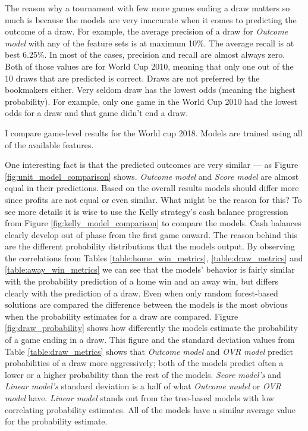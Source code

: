 The reason why a tournament with few more games ending a draw matters so much is because the models are very inaccurate when it comes to predicting the outcome of a draw. For example, the average precision of a draw for \textit{Outcome model} with any of the feature sets is at maximum 10\%. The average recall is at best 6.25\%. In most of the cases, precision and recall are almost always zero. Both of those values are for World Cup 2010, meaning that only one out of the 10 draws that are predicted is correct. Draws are not preferred by the bookmakers either. Very seldom draw has the lowest odds (meaning the highest probability). For example, only one game in the World Cup 2010 had the lowest odds for a draw and that game didn't end a draw.

I compare game-level results for the World cup 2018. Models are trained using all of the available features.

One interesting fact is that the predicted outcomes are very similar --- as Figure \ref{fig:unit_model_comparison} shows. \textit{Outcome model} and \textit{Score model} are almost equal in their predictions. Based on the overall results models should differ more since profits are not equal or even similar. What might be the reason for this? To see more details it is wise to use the Kelly strategy's cash balance progression from Figure \ref{fig:kelly_model_comparison} to compare the models. Cash balances clearly develop out of phase from the first game onward. The reason behind this are the different probability distributions that the models output. By observing the correlations from Tables \ref{table:home_win_metrics}, \ref{table:draw_metrics} and \ref{table:away_win_metrics} we can see that the models' behavior is fairly similar with the probability prediction of a home win and an away win, but differs clearly with the prediction of a draw. Even when only random forest-based solutions are compared the difference between the models is the most obvious when the probability estimates for a draw are compared. Figure \ref{fig:draw_probability} shows how differently the models estimate the probability of a game ending in a draw. This figure and the standard deviation values from Table \ref{table:draw_metrics} shows that \textit{Outcome model} and \textit{OVR model} predict probabilities of a draw more aggressively; both of the models predict often a lower or a higher probability than the rest of the models. \textit{Score model's} and \textit{Linear model's} standard deviation is a half of what \textit{Outcome model} or \textit{OVR model} have. \textit{Linear model} stands out from the tree-based models with low correlating probability estimates. All of the models have a similar average value for the probability estimate.

